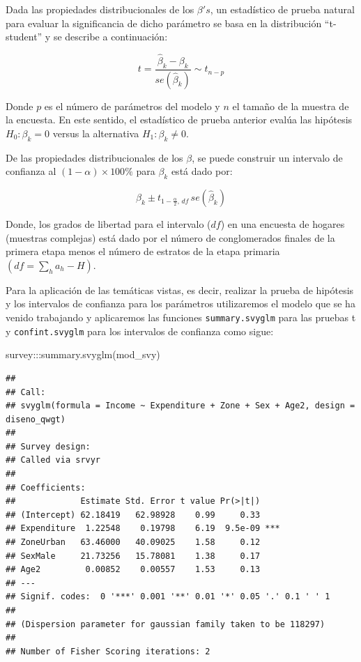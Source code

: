 \documentclass[
  12pt,
]{book}
\newenvironment{Shaded}{\begin{snugshade}}{\end{snugshade}}
\newcommand{\FunctionTok}[1]{\textcolor[rgb]{0.00,0.00,0.00}{#1}}
\newcommand{\NormalTok}[1]{#1}
\newcommand{\SpecialCharTok}[1]{\textcolor[rgb]{0.00,0.00,0.00}{#1}}
\begin{document}
Dada las propiedades distribucionales de los \(\beta's\), un estadístico de prueba natural para evaluar la significancia de dicho parámetro se basa en la distribución ``t-student'' y se describe a continuación:

\[
t=\frac{\hat{\beta}_{k}-\beta_{k}}{se\left(\hat{\beta}_{k}\right)}\sim t_{n-p}
\]

Donde \(p\) es el número de parámetros del modelo y \(n\) el tamaño de la muestra de la encuesta. En este sentido, el estadístico de prueba anterior evalúa las hipótesis \(H_{0}:\beta_{k}=0\) versus la alternativa \(H_{1}:\beta_{k}\neq0\).

De las propiedades distribucionales de los \(\beta\), se puede construir un intervalo de confianza al \((1-\alpha)\times100\%\) para \(\beta_{k}\) está dado por:

\[
\hat{\beta}_{k}\pm t_{1-\frac{\alpha}{2},\,df}\,se\left(\hat{\beta}_{k}\right)
\]

Donde, los grados de libertad para el intervalo (\(df\)) en una encuesta de hogares (muestras complejas) está dado por el número de conglomerados finales de la primera etapa menos el número de estratos de la etapa primaria \(\left(df=\sum_{h}a_{h}-H\right)\).

Para la aplicación de las temáticas vistas, es decir, realizar la prueba de hipótesis y los intervalos de confianza para los parámetros utilizaremos el modelo que se ha venido trabajando y aplicaremos las funciones \texttt{summary.svyglm} para las pruebas t y \texttt{confint.svyglm} para los intervalos de confianza como sigue:

\begin{Shaded}
\begin{Highlighting}[]
\NormalTok{survey}\SpecialCharTok{:::}\FunctionTok{summary.svyglm}\NormalTok{(mod\_svy)}
\end{Highlighting}
\end{Shaded}

\begin{verbatim}
## 
## Call:
## svyglm(formula = Income ~ Expenditure + Zone + Sex + Age2, design = diseno_qwgt)
## 
## Survey design:
## Called via srvyr
## 
## Coefficients:
##             Estimate Std. Error t value Pr(>|t|)    
## (Intercept) 62.18419   62.98928    0.99     0.33    
## Expenditure  1.22548    0.19798    6.19  9.5e-09 ***
## ZoneUrban   63.46000   40.09025    1.58     0.12    
## SexMale     21.73256   15.78081    1.38     0.17    
## Age2         0.00852    0.00557    1.53     0.13    
## ---
## Signif. codes:  0 '***' 0.001 '**' 0.01 '*' 0.05 '.' 0.1 ' ' 1
## 
## (Dispersion parameter for gaussian family taken to be 118297)
## 
## Number of Fisher Scoring iterations: 2
\end{verbatim}
\end{document}

